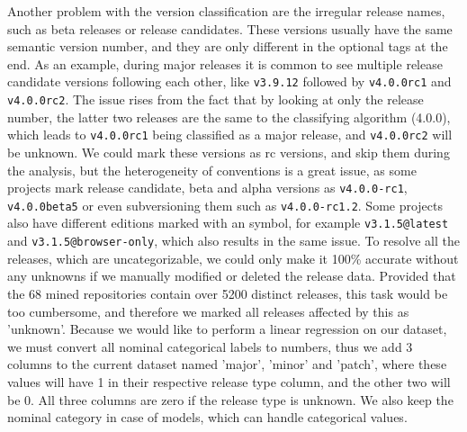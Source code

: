 Another problem with the version classification are the irregular release names, such as beta releases or release candidates. These versions usually have the same semantic version number, and they are only different in the optional tags at the end. As an example, during major releases it is common to see multiple release candidate versions following each other, like \texttt{v3.9.12} followed by \texttt{v4.0.0rc1} and \texttt{v4.0.0rc2}. The issue rises from the fact that by looking at only the release number, the latter two releases are the same to the classifying algorithm (4.0.0), which leads to \texttt{v4.0.0rc1} being classified as a major release, and \texttt{v4.0.0rc2} will be unknown. We could mark these versions as rc versions, and skip them during the analysis, but the heterogeneity of conventions is a great issue, as some projects mark release candidate, beta and alpha versions as \texttt{v4.0.0-rc1}, \texttt{v4.0.0beta5} or even subversioning them such as \texttt{v4.0.0-rc1.2}. Some projects also have different editions marked with an \@ symbol, for example \texttt{v3.1.5@latest} and \texttt{v3.1.5@browser-only}, which also results in the same issue. To resolve all the releases, which are uncategorizable, we could only make it 100\% accurate without any unknowns if we manually modified or deleted the release data. Provided that the 68 mined repositories contain over 5200 distinct releases, this task would be too cumbersome, and therefore we marked all releases affected by this as 'unknown'. Because we would like to perform a linear regression on our dataset, we must convert all nominal categorical labels to numbers, thus we add 3 columns to the current dataset named 'major', 'minor' and 'patch', where these values will have 1 in their respective release type column, and the other two will be 0. All three columns are zero if the release type is unknown. We also keep the nominal category in case of models, which can handle categorical values.

